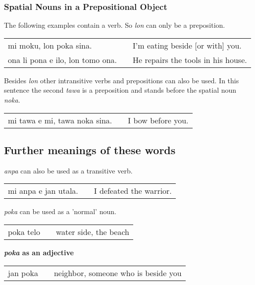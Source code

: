 %
\subsubsection*{Spatial Nouns in a Prepositional Object}
%

The following examples contain a verb. 
So \textit{lon} can only be a preposition. 

\begin{supertabular}{p{5,5cm}|ll}
mi moku, lon poka sina.    && I'm eating beside [or with] you. \\
ona li pona e ilo, lon tomo ona. && He repairs the tools in his house. \\
\end{supertabular} 

Besides \textit{lon} other intransitive verbs and prepositions can also be used. 
In this sentence the second \textit{tawa} is a preposition and stands before the spatial noun \textit{noka}. 

\begin{supertabular}{p{5,5cm}|ll}
mi tawa e mi, tawa noka sina. && I bow before you. \\
\end{supertabular} 

%
\subsection*{Further meanings of these words}

\textit{anpa} can also be used as a transitive verb.

\begin{supertabular}{p{5,5cm}|ll}
mi anpa e jan utala. && I defeated the warrior. \\
\end{supertabular} 


\textit{poka} can be used as a 'normal' noun.

\begin{supertabular}{p{5,5cm}|ll}
poka telo && water side, the beach \\
\end{supertabular} 

\textbf{\textit{poka} as an adjective} \\

\begin{supertabular}{p{5,5cm}|ll}
jan poka && neighbor, someone who is beside you \\
\end{supertabular} 
%

